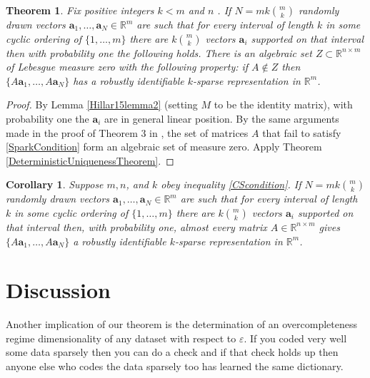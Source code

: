 \documentclass[journal, onecolumn]{IEEEtran}
\newtheorem{theorem}{Theorem}
\newtheorem{corollary}{Corollary}
\begin{document}
\begin{theorem}\label{Theorem3}
Fix positive integers $k < m$ and $n$ . If $N = mk{m \choose k}$ randomly drawn vectors $\mathbf{a}_1, \ldots, \mathbf{a}_N \in \mathbb{R}^m$ are such that for every interval of length $k$ in some cyclic ordering of $\{1, \ldots, m\}$ there are $k{m \choose k}$ vectors $\mathbf{a}_i$ supported on that interval then with probability one the following holds. There is an algebraic set $Z \subset \mathbb{R}^{n \times m}$ of Lebesgue measure zero with the following property: if $A \notin Z$ then $\{A\mathbf{a}_1, \ldots , A\mathbf{a}_N \}$ has a robustly identifiable $k$-sparse representation in $\mathbb{R}^m$.
\end{theorem}

\begin{proof}
By Lemma \ref{Hillar15lemma2} (setting $M$ to be the identity matrix), with probability one the $\mathbf{a}_i$ are in general linear position. By the same arguments made in the proof of Theorem 3 in \cite{Hillar15}, the set of matrices $A$ that fail to satisfy \eqref{SparkCondition} form an algebraic set of measure zero. Apply Theorem \ref{DeterministicUniquenessTheorem}.
\end{proof}

\begin{corollary}
Suppose $m, n$, and $k$ obey inequality \eqref{CScondition}.  If $N = mk{m \choose k}$ randomly drawn vectors $\mathbf{a}_1, \ldots, \mathbf{a}_N \in \mathbb{R}^m$ are such that for every interval of length $k$ in some cyclic ordering of $\{1, \ldots, m\}$ there are $k{m \choose k}$ vectors $\mathbf{a}_i$ supported on that interval then, with probability one, almost every matrix $A \in \mathbb{R}^{n \times m}$ gives $\{A\mathbf{a}_1, \ldots , A\mathbf{a}_N \}$ a robustly identifiable $k$-sparse representation in $\mathbb{R}^m$.
\end{corollary}



\section{Discussion}


Another implication of our theorem is the determination of an overcompleteness regime dimensionality of any dataset with respect to $\varepsilon$. If you coded very well some data sparsely then you can do a check and if that check holds up then anyone else who codes the data sparsely too has learned the same dictionary. 
\end{document}
